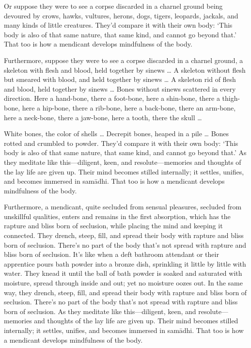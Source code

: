 \documentclass[12pt,openany]{book}%
\begin{document}
Or suppose they were to see a corpse discarded in a charnel ground being devoured by crows, hawks, vultures, herons, dogs, tigers, leopards, jackals, and many kinds of little creatures. They’d compare it with their own body: ‘This body is also of that same nature, that same kind, and cannot go beyond that.’ That too is how a mendicant develops mindfulness of the body. 

Furthermore, suppose they were to see a corpse discarded in a charnel ground, a skeleton with flesh and blood, held together by sinews … A skeleton without flesh but smeared with blood, and held together by sinews … A skeleton rid of flesh and blood, held together by sinews … Bones without sinews scattered in every direction. Here a hand-bone, there a foot-bone, here a shin-bone, there a thigh-bone, here a hip-bone, there a rib-bone, here a back-bone, there an arm-bone, here a neck-bone, there a jaw-bone, here a tooth, there the skull … 

White bones, the color of shells … Decrepit bones, heaped in a pile … Bones rotted and crumbled to powder. They’d compare it with their own body: ‘This body is also of that same nature, that same kind, and cannot go beyond that.’ As they meditate like this—diligent, keen, and resolute—memories and thoughts of the lay life are given up. Their mind becomes stilled internally; it settles, unifies, and becomes immersed in \textsanskrit{samādhi}. That too is how a mendicant develops mindfulness of the body. 

Furthermore, a mendicant, quite secluded from sensual pleasures, secluded from unskillful qualities, enters and remains in the first absorption, which has the rapture and bliss born of seclusion, while placing the mind and keeping it connected. They drench, steep, fill, and spread their body with rapture and bliss born of seclusion. There’s no part of the body that’s not spread with rapture and bliss born of seclusion. It’s like when a deft bathroom attendant or their apprentice pours bath powder into a bronze dish, sprinkling it little by little with water. They knead it until the ball of bath powder is soaked and saturated with moisture, spread through inside and out; yet no moisture oozes out. In the same way, they drench, steep, fill, and spread their body with rapture and bliss born of seclusion. There’s no part of the body that’s not spread with rapture and bliss born of seclusion. As they meditate like this—diligent, keen, and resolute—memories and thoughts of the lay life are given up. Their mind becomes stilled internally; it settles, unifies, and becomes immersed in \textsanskrit{samādhi}. That too is how a mendicant develops mindfulness of the body. 
\end{document}
